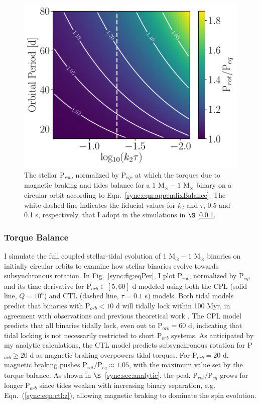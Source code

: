 \begin{figure}
	\includegraphics[width=\columnwidth]{analyticTorque.pdf}
   \caption{The stellar P$_{rot}$, normalized by P$_{eq}$, at which the torques due to magnetic braking and tides balance for a 1 M$_{\odot} - 1$ M$_{\odot}$ binary on a circular orbit according to Eqn.~\ref{sync:eqn:appendixBalance}. The white dashed line indicates the fiducial values for $k_2$ and $\tau$, 0.5 and 0.1 s, respectively, that I adopt in the simulations in $\S$~\ref{sync:sec:mattBalance}.}%
    \label{sync:fig:analyticBalance}%
\end{figure}


\subsubsection{Torque Balance} \label{sync:sec:mattBalance}

I simulate the full coupled stellar-tidal evolution of 1 M$_{\odot} - 1$ M$_{\odot}$ binaries on initially circular orbits to examine how stellar binaries evolve towards subsynchronous rotation. In Fig.~\ref{sync:fig:eqPer}, I plot P$_{rot}$, normalized by P$_{eq}$, and its time derivative for P$_{orb} \in [5,60]$ d modeled using both the CPL (solid line, $Q=10^6$) and CTL (dashed line, $\tau = 0.1$ s) models. Both tidal models predict that binaries with P$_{orb} < 10$ d will tidally lock within 100 Myr, in agreement with observations \citep{Meibom2005} and previous theoretical work \citep{Zahn1989}. The CPL model predicts that all binaries tidally lock, even out to P$_{orb} = 60$ d, indicating that tidal locking is not necessarily restricted to short P$_{orb}$ systems. As anticipated by my analytic calculations, the CTL model predicts subsynchronous rotation for P$_{orb} \geq 20$ d as magnetic braking overpowers tidal torques. For P$_{orb} = 20$ d, magnetic braking pushes P$_{rot}/$P$_{eq} \approx 1.05$, with the maximum value set by the torque balance. As shown in $\S$~\ref{sync:sec:analytic}, the peak P$_{rot}/$P$_{eq}$ grows for longer P$_{orb}$ since tides weaken with increasing binary separation, e.g. Eqn.~(\ref{sync:eqn:ctl:z}), allowing magnetic braking to dominate the spin evolution. 

